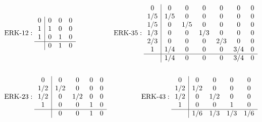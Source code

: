 \documentclass{csri19}
\begin{document}
\begin{align*}&\text{ERK-}12:
 \begin{array}{c|ccc}
0   & 0 & 0 & 0\\
1   & 1 & 0 & 0\\
1   & 0 & 1 & 0\\
\hline
    & 0   & 1 & 0
\end{array}
& \text{ERK-}35: 
\begin{array}{c|cccccc}
0   & 0   & 0   & 0   & 0   & 0   & 0\\
1/5 & 1/5 & 0   & 0   & 0   & 0   & 0\\
1/5 & 0   & 1/5 & 0   & 0   & 0   & 0\\
1/3 & 0   & 0   & 1/3 & 0   & 0   & 0\\
2/3 & 0   & 0   & 0   & 2/3 & 0   & 0\\
1   & 1/4 & 0   & 0   & 0   & 3/4 & 0\\
\hline
    & 1/4 & 0   & 0   & 0   & 3/4 & 0
\end{array}\\
\\
&\text{ERK-}23: 
\begin{array}{c|cccc}
0   & 0   & 0   & 0 & 0\\
1/2 & 1/2 & 0   & 0 & 0\\
1/2 & 0   & 1/2 & 0 & 0\\
1   & 0   & 0   & 1 & 0\\
\hline
    & 0   & 0   & 1 & 0
\end{array}
& \text{ERK-}43: 
\begin{array}{c|cccc}
0   & 0   & 0   & 0   & 0 \\
1/2 & 1/2 & 0   & 0   & 0 \\
1/2 & 0   & 1/2 & 0   & 0 \\
1   & 0   & 0   & 1   & 0 \\
\hline
    & 1/6 & 1/3 & 1/3 & 1/6
\end{array} 
\end{align*}
\end{document}
